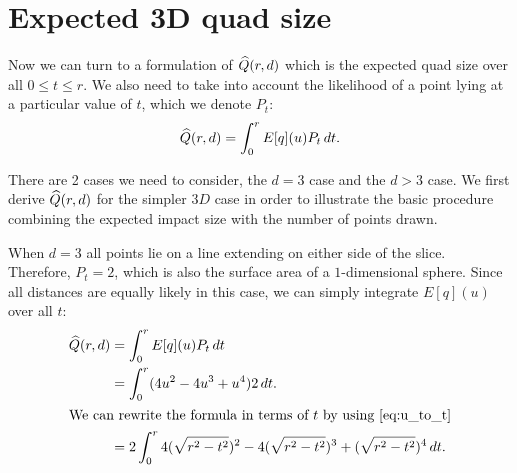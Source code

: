 \section{Expected 3D quad size}

Now we can turn to a formulation of $\widehat{Q}(r,d)$ which is the expected quad
size over all $0 \le t \le r$.  We also need to take into account the
likelihood of a point lying at a particular value of $t$, which we
denote $P_t$:
\begin{align*}
  \widehat{Q}(r,d) = \int_0^r E[q](u) P_t \, dt
  \text{.}
\end{align*}

There are 2 cases we need to consider, the $d=3$ case and the $d>3$ case.
We first derive $\widehat{Q}(r,d)$ for the simpler $3D$ case in order to illustrate
the basic procedure combining the expected impact size with the number of
points drawn.

When $d=3$ all points lie on a line extending on either side of the slice.
Therefore, $P_t = 2$, which is also the surface area of a $1$-dimensional
sphere.
Since all distances are equally likely in this case, we can simply integrate
$E[q](u)$ over all $t$:
\begin{align*}
\expfrags 
     &= \int_{0}^r E[q] (u) P_t \, dt \\
     &= \int_{0}^r (4u^2 - 4u^3 + u^4) 2 \, dt \text{.}\\
\intertext{We can rewrite the formula in terms of $t$ by using \autoref{eq:u_to_t}}
     &= 2 \int_{0}^r 
          4(\sqrt{r^2-t^2})^2 - 4(\sqrt{r^2-t^2})^3 + (\sqrt{r^2-t^2})^4 \, dt
          \text{.}
\end{align*}

